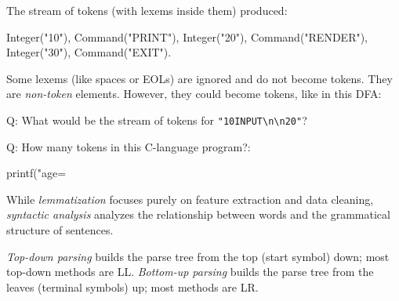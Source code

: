 \documentclass{article}
\begin{document}
The stream of tokens (with lexems inside them) produced:
\begin{ffcode}
Integer("10"), Command("PRINT"), Integer("20"),
Command("RENDER"), Integer("30"), Command("EXIT").
\end{ffcode}
\plush{}

Some lexems (like spaces or EOLs) are ignored and do not become tokens. They are \emph{non-token} elements. However, they could become tokens, like in this DFA:\\

Q: What would be the stream of tokens for \texttt{"10\textvisiblespace{}INPUT\textbackslash{}n\textbackslash{}n\textvisiblespace{}\textvisiblespace{}\textvisiblespace{}20"}?
\plush{}

Q: How many tokens in this C-language program?:
\begin{ffcode}
printf("age=%
\end{ffcode}
\plush{}


While \emph{lemmatization} focuses purely on feature extraction and data cleaning, \emph{syntactic analysis} analyzes the relationship between words and the grammatical structure of sentences.
\plush{}


\emph{Top-down parsing} builds the parse tree from the top (start
symbol) down; most top-down methods are LL.
\emph{Bottom-up parsing} builds the parse tree from the leaves
(terminal symbols) up; most methods are LR.
\plush{}
\end{document}
